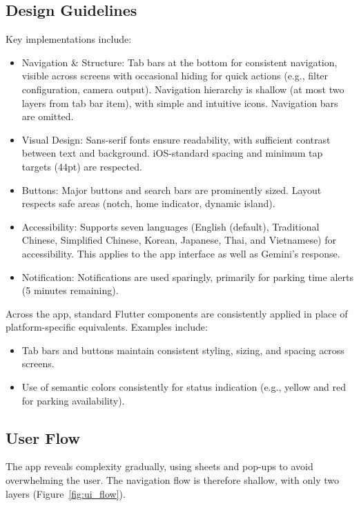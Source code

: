\subsection{Design Guidelines}

Key implementations include:

\begin{itemize}
    \item Navigation \& Structure: Tab bars at the bottom for consistent navigation, visible across screens with occasional hiding for quick actions (e.g., filter configuration, camera output). Navigation hierarchy is shallow (at most two layers from tab bar item), with simple and intuitive icons. Navigation bars are omitted.
    \item Visual Design: Sans-serif fonts ensure readability, with sufficient contrast between text and background. iOS-standard spacing and minimum tap targets (44pt) are respected.
    \item Buttons: Major buttons and search bars are prominently sized. Layout respects safe areas (notch, home indicator, dynamic island). 
    \item Accessibility: Supports seven languages (English (default), Traditional Chinese, Simplified Chinese, Korean, Japanese, Thai, and Vietnamese) for accessibility. This applies to the app interface as well as Gemini's response.
    \item Notification: Notifications are used sparingly, primarily for parking time alerts (5 minutes remaining).
\end{itemize}

Across the app, standard Flutter components are consistently applied in place of platform-specific equivalents. Examples include:

\begin{itemize}
    \item Tab bars and buttons maintain consistent styling, sizing, and spacing across screens.
    \item Use of semantic colors consistently for status indication (e.g., yellow and red for parking availability).
\end{itemize}

\subsection{User Flow}

The app reveals complexity gradually, using sheets and pop-ups to avoid overwhelming the user. The navigation flow is therefore shallow, with only two layers (Figure~\ref{fig:ui_flow}).

